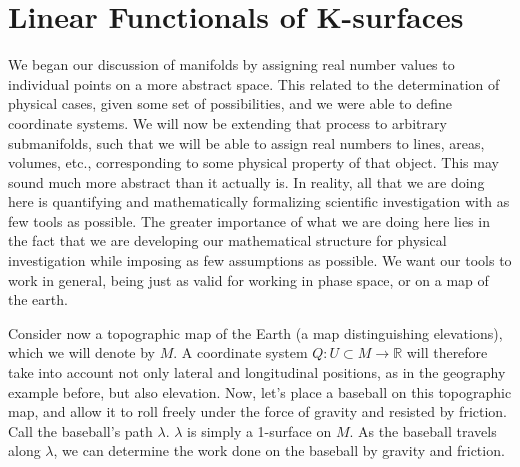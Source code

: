 \documentclass{book}
\begin{document}
\section{Linear Functionals of K-surfaces}







We began our discussion of manifolds by assigning real number values to individual points on a more abstract space. This related to the determination of physical cases, given some set of possibilities, and we were able to define coordinate systems. We will now be extending that process to arbitrary submanifolds, such that we will be able to assign real numbers to lines, areas, volumes, etc., corresponding to some physical property of that object. This may sound much more abstract than it actually is. In reality, all that we are doing here is quantifying and mathematically formalizing scientific investigation with as few tools as possible. The greater importance of what we are doing here lies in the fact that we are developing our mathematical structure for physical investigation while imposing as few assumptions as possible. We want our tools to work in general, being just as valid for working in phase space, or on a map of the earth. 
 
 Consider now a topographic map of the Earth (a map distinguishing elevations), which we will denote by $M$. A coordinate system $Q: U \subset M \to \mathbb{R}$ will therefore take into account not only lateral and longitudinal positions, as in the geography example before, but also elevation. Now, let's place a baseball on this topographic map, and allow it to roll freely under the force of gravity and resisted by friction. Call the baseball's path $\lambda$. $\lambda$ is simply a 1-surface on $M$. As the baseball travels along $\lambda$, we can determine the work done on the baseball by gravity and friction. 
\end{document}
